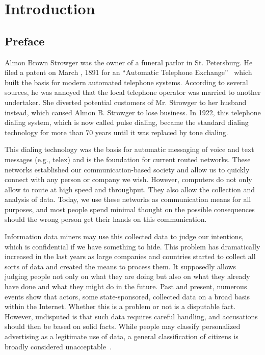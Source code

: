


\part{Introduction}
\chapter{Preface}
Almon Brown Strowger was the owner of a funeral parlor in St. Petersburg. He filed a patent on March , 1891 for an ``Automatic Telephone Exchange''~\cite{pulseDialingPatent} which built the basis for modern automated telephone systems. According to several sources, he was annoyed that the local telephone operator was married to another undertaker. She diverted potential customers of Mr. Strowger to her husband instead, which caused Almon B. Strowger to lose business. In 1922, this telephone dialing system, which is now called pulse dialing, became the standard dialing technology for more than 70 years until it was replaced by tone dialing.

This dialing technology was the basis for automatic messaging of voice and text messages (e.g., telex) and is the foundation for current routed networks. These networks established our communication-based society and allow us to quickly connect with any person or company we wish. However, computers do not only allow to route at high speed and throughput. They also allow the collection and analysis of data. Today, we use these networks as communication means for all purposes, and most people spend minimal thought on the possible consequences  should the wrong person get their hands on this communication. 

Information data miners may use this collected data to judge our intentions, which is confidential if we have something to hide. This problem has dramatically increased in the last years as large companies and countries started to collect all sorts of data and created the means to process them. It supposedly allows judging people not only on what they are doing but also on what they already have done and what they might do in the future. Past and present, numerous events show that actors, some state-sponsored, collected data on a broad basis within the Internet. Whether this is a problem or not is a disputable fact. However, undisputed is that such data requires careful handling, and accusations should then be based on solid facts. While people may classify personalized advertising as a legitimate use of data, a general classification of citizens is broadly considered unacceptable~\cite{NCR2013,XKeyscore,Ball2013,Greenberg2013,Leuenberger1989}.

